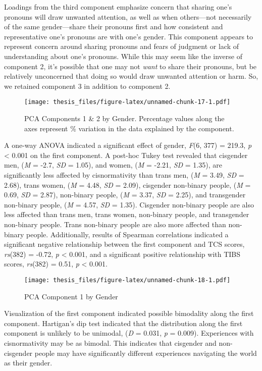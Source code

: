 \documentclass[12pt,twoside]{reedthesis}
\begin{document}
Loadings from the third component emphasize concern that sharing one's pronouns will draw unwanted attention, as well as when others---not necessarily of the same gender---share their pronouns first and how consistent and representative one's pronouns are with one's gender. This component appears to represent concern around sharing pronouns and fears of judgment or lack of understanding about one's pronouns. While this may seem like the inverse of component 2, it's possible that one may not \emph{want} to share their pronouns, but be relatively unconcerned that doing so would draw unwanted attention or harm. So, we retained component 3 in addition to component 2.
\begin{figure}
\centering
\texttt{[image: thesis\_files/figure-latex/unnamed-chunk-17-1.pdf]}
\caption{\label{fig:unnamed-chunk-17}PCA Components 1 \& 2 by Gender. Percentage values along the axes represent \% variation in the data explained by the component.}
\end{figure}
A one-way ANOVA indicated a significant effect of gender, \emph{F}(6, 377) = 219.3, \emph{p} \textless{} 0.001 on the first component. A post-hoc Tukey test revealed that cisgender men, (\emph{M} = -2.7, \emph{SD} = 1.05), and women, (\emph{M} = -2.21, \emph{SD} = 1.35), are significantly less affected by cisnormativity than trans men, (\emph{M} = 3.49, \emph{SD} = 2.68), trans women, (\emph{M} = 4.48, \emph{SD} = 2.09), cisgender non-binary people, (\emph{M} = 0.69, \emph{SD} = 2.87), non-binary people, (\emph{M} = 3.37, \emph{SD} = 2.25), and transgender non-binary people, (\emph{M} = 4.57, \emph{SD} = 1.35). Cisgender non-binary people are also less affected than trans men, trans women, non-binary people, and transgender non-binary people. Trans non-binary people are also more affected than non-binary people. Additionally, results of Spearman correlations indicated a significant negative relationship between the first component and TCS scores, \emph{rs}(382) = -0.72, \emph{p} \textless{} 0.001, and a significant positive relationship with TIBS scores, \emph{rs}(382) = 0.51, \emph{p} \textless{} 0.001.
\begin{figure}
\centering
\texttt{[image: thesis\_files/figure-latex/unnamed-chunk-18-1.pdf]}
\caption{\label{fig:unnamed-chunk-18}PCA Component 1 by Gender}
\end{figure}
Visualization of the first component indicated possible bimodality along the first component. Hartigan's dip test indicated that the distribution along the first component is unlikely to be unimodal, (\emph{D} = 0.031, \emph{p} = 0.009). Experiences with cisnormativity may be as bimodal. This indicates that cisgender and non-cisgender people may have significantly different experiences navigating the world as their gender.
\end{document}
